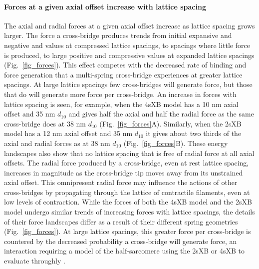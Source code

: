 \documentclass[10pt]{article}
\newcommand{\citep}[1]{\cite{#1}} %
\begin{document}
\paragraph{Forces at a given axial offset increase with lattice spacing} %
The axial and radial forces at a given axial offset increase as lattice spacing grows larger.
The force a cross-bridge produces trends from initial expansive and negative and values at compressed lattice spacings, to spacings where little force is produced, to large positive and compressive values at expanded lattice spacings (Fig.~\ref{fig_forces}). 
This effect competes with the decreased rate of binding and force generation that a multi-spring cross-bridge experiences at greater lattice spacings. 
At large lattice spacings few cross-bridges will generate force, but those that do will generate more force per cross-bridge. 
An increase in forces with lattice spacing is seen, for example, when the 4sXB model has a 10 nm axial offset and 35 nm $d_{10}$  and gives half the axial and half the radial force as the same cross-bridge does at 38 nm $d_{10}$ (Fig.~\ref{fig_forces}A). 
Similarly, when the 2sXB model has a 12 nm axial offset and 35 nm $d_{10}$ it gives about two thirds of the axial and radial forces as at 38 nm $d_{10}$ (Fig.~\ref{fig_forces}B).  
These energy landscapes also show that no lattice spacing that is free of radial force at all axial offsets.  
The radial force produced by a cross-bridge, even at rest lattice spacing, increases in magnitude as the cross-bridge tip moves away from its unstrained axial offset. 
This omnipresent radial force may influence the actions of other cross-bridges by propagating through the lattice of contractile filaments, even at low levels of contraction.
While the forces of both the 4sXB model and the 2sXB model undergo similar trends of increasing forces with lattice spacings, the details of their force landscapes differ as a result of their different spring geometries (Fig.~\ref{fig_forces}). 
At large lattice spacings, this greater force per cross-bridge is countered by the decreased probability a cross-bridge will generate force, an interaction requiring a model of the half-sarcomere using the 2sXB or 4sXB to evaluate throughly \citep{Martyn2004}. 
\end{document}
